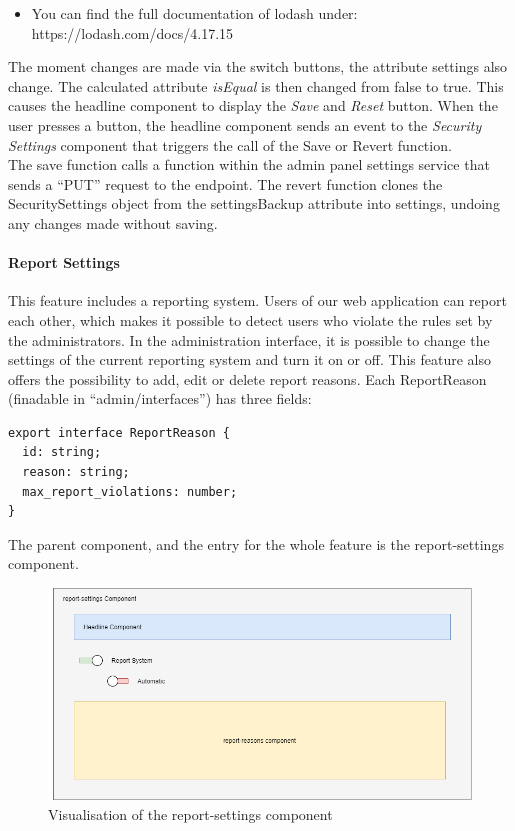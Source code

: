 \begin{itemize}
    \item You can find the full documentation of lodash under: https://lodash.com/docs/4.17.15
\end{itemize}

The moment changes are made via the switch buttons, the attribute settings also change.
The calculated attribute \textit{isEqual} is then changed from false to true.
This causes the headline component to display the \textit{Save} and \textit{Reset} button.
When the user presses a button, the headline component sends an event to the \textit{Security Settings} component that
triggers the call of the Save or Revert function. \\
The save function calls a function within the admin panel settings service that sends a \enquote{PUT} request to the
endpoint.
The revert function clones the SecuritySettings object from the settingsBackup attribute into settings, undoing any changes made without saving.

\paragraph{Report Settings}
This feature includes a reporting system.
Users of our web application can report each other, which makes it possible to detect users who violate the rules set
by the administrators.
In the administration interface, it is possible to change the settings of the current reporting system and turn it on
or off.
This feature also offers the possibility to add, edit or delete report reasons.
Each ReportReason (finadable in \enquote{admin/interfaces}) has three fields:

\begin{verbatim}
export interface ReportReason {
  id: string;
  reason: string;
  max_report_violations: number;
}
\end{verbatim}

The parent component, and the entry for the whole feature is the report-settings component.

\begin{figure}[h]
    \centering
    \includegraphics[width=1.0\textwidth]{./images/report_settings_1}
    \caption{Visualisation of the report-settings component}
    \label{fig:reportset}
\end{figure}

